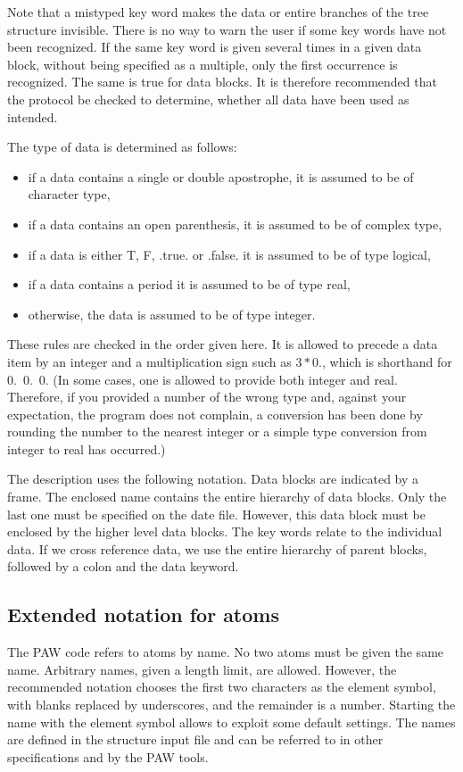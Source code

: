 \documentclass[final,12pt,makeidx,DIV=calc]{article}
\begin{document}
Note that a mistyped key word makes the data or entire branches of the
tree structure invisible. There is no way to warn the user if some key
words have not been recognized.  If the same key word is given several
times in a given data block, without being specified as a multiple,
only the first occurrence is recognized.  The same is true for data
blocks. It is therefore recommended that the protocol be checked to
determine, whether all data have been used as intended.

The type of data is determined as follows:
\begin{itemize}
\item if a data contains a single or double apostrophe, it is
  assumed to be of character type,
\item if a data contains an open parenthesis, it is assumed to be of
  complex type,
\item if a data is either T, F, .true. or .false. it is assumed to be of
  type logical,
\item if a data contains a period it is assumed to be of type real,
\item otherwise, the data is assumed to be of type integer.
\end{itemize}
These rules are checked in the order given here.  It is allowed to
precede a data item by an integer and a multiplication sign such as
$3*0.$, which is shorthand for 0.\ 0.\ 0. (In some cases, one is
allowed to provide both integer and real. Therefore, if you provided a
number of the wrong type and, against your expectation, the program
does not complain, a conversion has been done by rounding the number
to the nearest integer or a simple type conversion from integer to
real has occurred.)

The description uses the following notation. Data blocks are
indicated by a frame. The enclosed name contains the entire
hierarchy of data blocks. Only the last one must be specified on the
date file. However, this data block must be enclosed by the higher
level data blocks. The key words relate to the individual data. If we
cross reference data, we use the entire hierarchy of parent
blocks, followed by a colon and the data keyword.

%
\subsection{Extended notation for atoms}
\label{sec:extendedatomnotation}
The PAW code refers to atoms by name. No two atoms must be given the
same name. Arbitrary names, given a length limit, are allowed.
However, the recommended notation chooses the first two characters as
the element symbol, with blanks replaced by underscores, and the
remainder is a number. Starting the name with the element symbol
allows to exploit some default settings. The names are defined in the
structure input file and can be referred to in other specifications
and by the PAW tools.
\end{document}
